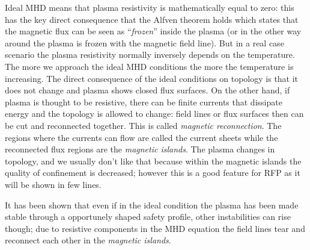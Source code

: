 Ideal MHD means that plasma resistivity is mathematically equal to zero: this has the key direct consequence that the Alfven theorem holds which states that the magnetic flux can be seen as ``\textit{frozen}'' inside the plasma (or in the other way around the plasma is frozen with the magnetic field line).
But in a real case scenario the plasma resistivity normally inversely depends on the temperature. The more we approach the ideal MHD conditions the more the temperature is increasing. The direct consequence of the ideal conditions on topology is that it does not change and plasma shows closed flux surfaces. On the other hand, if plasma is thought to be resistive, there can be finite currents that dissipate energy and the topology is allowed to change: field lines or flux surfaces then can be cut and reconnected together. This is called \textit{magnetic reconnection}. The regions where the currents can flow are called the current sheets while the reconnected flux regions are the \textit{magnetic islands}. The plasma changes in topology, and we usually don't like that because within the magnetic islands the quality of confinement is decreased; however this is a good feature for RFP as it will be shown in few lines.

It has been shown that even if in the ideal condition the plasma has been made stable through a opportunely shaped safety profile, other instabilities can rise though; due to resistive components in the MHD equation the field lines tear and reconnect each other in the \textit{magnetic islands}.

